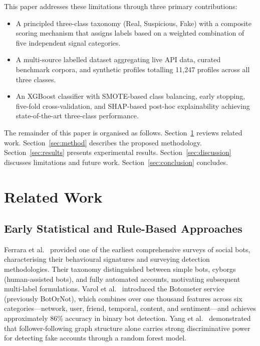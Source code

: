 \documentclass[conference]{IEEEtran}
\begin{document}
This paper addresses these limitations through three primary
contributions:
\begin{itemize}
  \item A principled three-class taxonomy (Real, Suspicious, Fake) with
        a composite scoring mechanism that assigns labels based on a
        weighted combination of five independent signal categories.
  \item A multi-source labelled dataset aggregating live API data,
        curated benchmark corpora, and synthetic profiles totalling
        11,247 profiles across all three classes.
  \item An XGBoost classifier with SMOTE-based class balancing, early
        stopping, five-fold cross-validation, and SHAP-based post-hoc
        explainability achieving state-of-the-art three-class performance.
\end{itemize}

The remainder of this paper is organised as follows.
Section~\ref{sec:related} reviews related work.
Section~\ref{sec:method} describes the proposed methodology.
Section~\ref{sec:results} presents experimental results.
Section~\ref{sec:discussion} discusses limitations and future work.
Section~\ref{sec:conclusion} concludes.

\section{Related Work}
\label{sec:related}

\subsection{Early Statistical and Rule-Based Approaches}

Ferrara et al.~\cite{b1} provided one of the earliest comprehensive
surveys of social bots, characterising their behavioural signatures and
surveying detection methodologies. Their taxonomy distinguished between
simple bots, cyborgs (human-assisted bots), and fully automated accounts,
motivating subsequent multi-label formulations. Varol et al.~\cite{b2}
introduced the Botometer service (previously BotOrNot), which combines
over one thousand features across six categories---network, user, friend,
temporal, content, and sentiment---and achieves approximately 86\%
accuracy in binary bot detection. Yang et al.~\cite{b4} demonstrated that
follower-following graph structure alone carries strong discriminative
power for detecting fake accounts through a random forest model.
\end{document}
